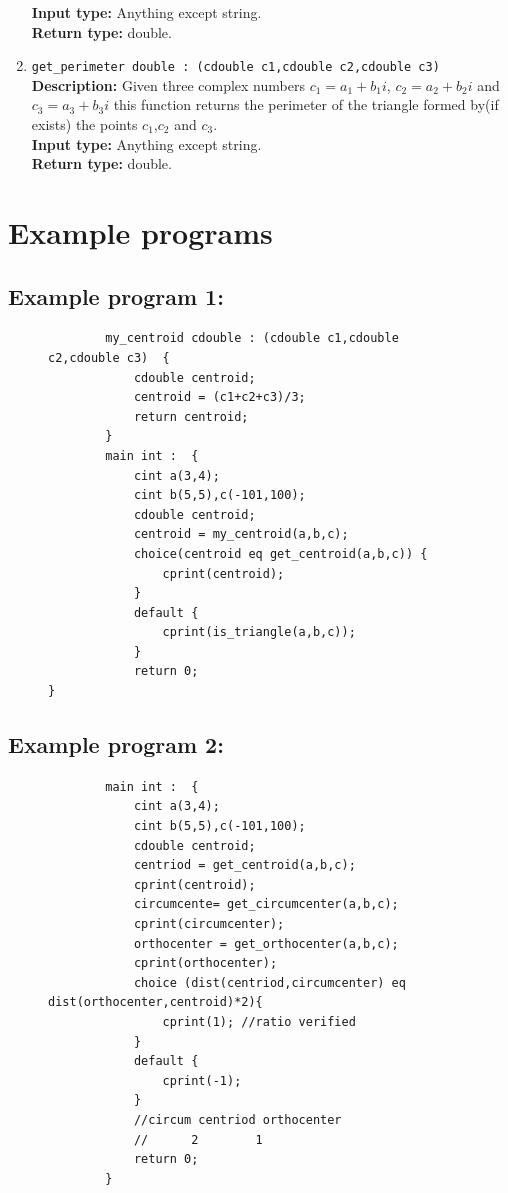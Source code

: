 \documentclass[12pt]{article}
\begin{document}
\begin{enumerate}
    \textbf{Input type:} Anything except string. \\
    \textbf{Return type:} double.
    \item \texttt{get\_perimeter double : (cdouble c1,cdouble c2,cdouble c3)} \\ 
    \textbf{Description:} Given three complex numbers $c_1=a_1+b_1i$, $c_2=a_2+b_2i$ and $c_3=a_3+b_3i$ this function returns the perimeter of the triangle formed by(if exists) the points $c_1$,$c_2$ and $c_3$.\\
    \textbf{Input type:} Anything except string. \\
    \textbf{Return type:} double.
\end{enumerate}

\section{Example programs}
\subsection{Example program 1:}
\begin{figure}[H]
    \label{ex_program_1}
    \centering
    \begin{BVerbatim}
        my_centroid cdouble : (cdouble c1,cdouble c2,cdouble c3)  {
            cdouble centroid;
            centroid = (c1+c2+c3)/3;
            return centroid;
        }
        main int :  {
            cint a(3,4);
            cint b(5,5),c(-101,100);
            cdouble centroid;
            centroid = my_centroid(a,b,c);
            choice(centroid eq get_centroid(a,b,c)) {
                cprint(centroid);
            } 
            default {
                cprint(is_triangle(a,b,c));
            }
            return 0;
}
    \end{BVerbatim}
\end{figure}
\subsection{Example program 2:}
\begin{figure}[H]
    \label{ex_program_2}
    \centering
    \begin{BVerbatim}
        main int :  {
            cint a(3,4);
            cint b(5,5),c(-101,100);
            cdouble centroid;
            centriod = get_centroid(a,b,c);
            cprint(centroid);
            circumcente= get_circumcenter(a,b,c);
            cprint(circumcenter);
            orthocenter = get_orthocenter(a,b,c);
            cprint(orthocenter);
            choice (dist(centriod,circumcenter) eq dist(orthocenter,centroid)*2){
                cprint(1); //ratio verified
            }
            default {
                cprint(-1);
            }
            //circum centriod orthocenter
            //      2        1
            return 0;
        }
    \end{BVerbatim}
\end{figure}
\end{document}
